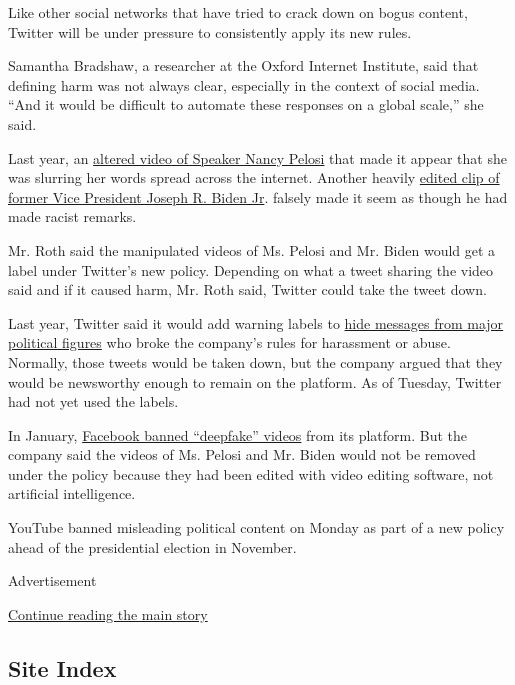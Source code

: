 Like other social networks that have tried to crack down on bogus
content, Twitter will be under pressure to consistently apply its new
rules.

Samantha Bradshaw, a researcher at the Oxford Internet Institute, said
that defining harm was not always clear, especially in the context of
social media. ``And it would be difficult to automate these responses on
a global scale,'' she said.

Last year, an
\href{https://www.nytimes.com/2019/05/24/us/politics/pelosi-doctored-video.html}{altered
video of Speaker Nancy Pelosi} that made it appear that she was slurring
her words spread across the internet. Another heavily
\href{https://www.nytimes.com/2020/01/07/us/politics/biden-video-disinformation-spread.html}{edited
clip of former Vice President Joseph R. Biden Jr}. falsely made it seem
as though he had made racist remarks.

Mr. Roth said the manipulated videos of Ms. Pelosi and Mr. Biden would
get a label under Twitter's new policy. Depending on what a tweet
sharing the video said and if it caused harm, Mr. Roth said, Twitter
could take the tweet down.

Last year, Twitter said it would add warning labels to
\href{https://www.nytimes.com/2019/06/27/technology/twitter-politicans-labels-abuse.html}{hide
messages from major political figures} who broke the company's rules for
harassment or abuse. Normally, those tweets would be taken down, but the
company argued that they would be newsworthy enough to remain on the
platform. As of Tuesday, Twitter had not yet used the labels.

In January,
\href{https://www.nytimes.com/2020/01/07/technology/facebook-says-it-will-ban-deepfakes.html}{Facebook
banned ``deepfake'' videos} from its platform. But the company said the
videos of Ms. Pelosi and Mr. Biden would not be removed under the policy
because they had been edited with video editing software, not artificial
intelligence.

YouTube banned misleading political content on Monday as part of a new
policy ahead of the presidential election in November.

Advertisement

\protect\hyperlink{after-bottom}{Continue reading the main story}

\hypertarget{site-index}{%
\subsection{Site Index}\label{site-index}}


